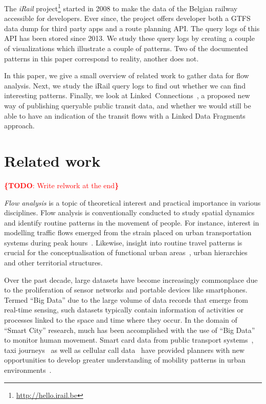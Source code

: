 \documentclass{sig-alternate}
\newcommand{\todo}[1]{\noindent\textcolor{red}{{\bf \{TODO}: #1{\bf \}}}}
\begin{document}
The \emph{iRail} project\footnote{\url{http://hello.irail.be}} started in 2008 to make the data of the Belgian railway accessible for developers.
Ever since, the project offers developer both a GTFS data dump for third party apps and a route planning API.
The query logs of this API has been stored since 2013.
We study these query logs by creating a couple of visualizations which illustrate a couple of patterns.
Two of the documented patterns in this paper correspond to reality, another does not.

In this paper, we give a small overview of related work to gather data for flow analysis.
Next, we study the iRail query logs to find out whether we can find interesting patterns.
Finally, we look at Linked~Connections~\cite{lc}, a proposed new way of publishing queryable public transit data, and whether we would still be able to have an indication of the transit flows with a Linked Data Fragments~\cite{ldf} approach.

\section{Related work}
\label{sec:relwork}

\todo{Write relwork at the end}

\emph{Flow analysis} is a topic of theoretical interest and practical importance in various disciplines. 
Flow analysis is conventionally conducted to study spatial dynamics and identify routine patterns in the movement of people.
For instance, interest in modelling traffic flows emerged from the strain placed on urban transportation systems during peak hours~\cite{roth,ferreira}.
Likewise, insight into routine travel patterns is crucial for the conceptualisation of functional urban areas~\cite{servillo,sykora}, urban hierarchies~\cite{christaller} and other territorial structures.

Over the past decade, large datasets have become increasingly commonplace due to the proliferation of sensor networks and portable devices like smartphones.
Termed ``Big Data'' due to the large volume of data records that emerge from real-time sensing\cite{kitchin}, such datasets typically contain information of activities or processes linked to the space and time where they occur.
In the domain of ``Smart City'' research, much has been accomplished with the use of ``Big Data'' to monitor human movement.
Smart card data from public transport systems~\cite{roth,beecham}, taxi journeys~\cite{ferreira} as well as cellular call data~\cite{sevtsuk} have provided planners with new opportunities to develop greater understanding of mobility patterns in urban environments~\cite{batty}.
\end{document}
